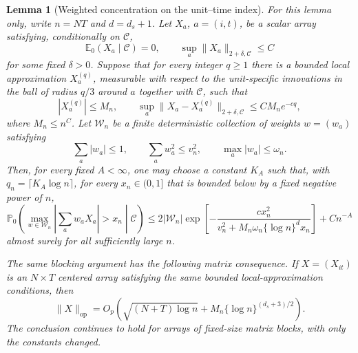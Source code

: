 \documentclass[11pt]{article}
\numberwithin{equation}{section}
\newtheorem{lemma}{Lemma}
\theoremstyle{remark}
\newcommand{\Ezero}{\mathbb E_0}
\newcommand{\Pzero}{\mathbb P_0}
\newcommand{\op}{\operatorname{op}}
\begin{document}
\begin{lemma}[Weighted concentration on the unit--time index]
\label{lem:weighted_concentration}
For this lemma only, write $n=NT$ and $d=d_s+1$. Let $X_a$, $a=(i,t)$, be a scalar array satisfying, conditionally on $\mathscr C$,
\[
\Ezero(X_a\mid\mathscr C)=0,
\qquad
\sup_a\|X_a\|_{2+\delta,\mathscr C}\le C
\]
for some fixed $\delta>0$. Suppose that for every integer $q\ge1$ there is a bounded local approximation $X_a^{(q)}$, measurable with respect to the unit-specific innovations in the ball of radius $q/3$ around $a$ together with $\mathscr C$, such that
\[
|X_a^{(q)}|\le M_n,
\qquad
\sup_a\|X_a-X_a^{(q)}\|_{2+\delta,\mathscr C}
\le C M_n e^{-cq},
\]
where $M_n\le n^C$. Let $\mathcal W_n$ be a finite deterministic collection of weights $w=(w_a)$ satisfying
\[
\sum_a|w_a|\le1,
\qquad
\sum_aw_a^2\le v_n^2,
\qquad
\max_a|w_a|\le\omega_n.
\]
Then, for every fixed $A<\infty$, one may choose a constant $K_A$ such that, with $q_n=\lceil K_A\log n\rceil$, for every $x_n\in(0,1]$ that is bounded below by a fixed negative power of $n$,
\begin{equation}
\label{eq:weighted_bernstein}
\Pzero\!\left(
\max_{w\in\mathcal W_n}
\left|\sum_aw_aX_a\right|>x_n
\middle|\mathscr C
\right)
\le
2|\mathcal W_n|
\exp\!\left[
-\frac{c x_n^2}
{v_n^2+M_n\omega_n\{\log n\}^{d}x_n}
\right]
+Cn^{-A}
\end{equation}
almost surely for all sufficiently large $n$.

The same blocking argument has the following matrix consequence. If $X=(X_{it})$ is an $N\times T$ centered array satisfying the same bounded local-approximation conditions, then
\begin{equation}
\label{eq:matrix_block_concentration}
\|X\|_{\op}
=
O_p\!\left(
\sqrt{(N+T)\log n}
+
M_n\{\log n\}^{(d_s+3)/2}
\right).
\end{equation}
The conclusion continues to hold for arrays of fixed-size matrix blocks, with only the constants changed.
\end{lemma}
\end{document}
